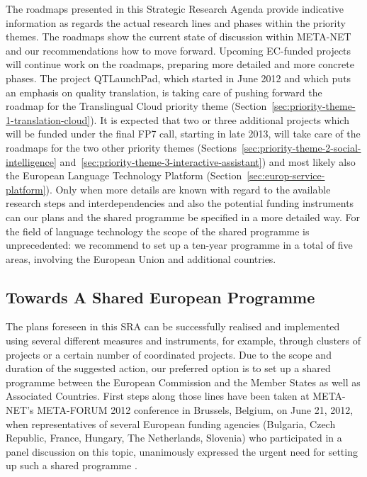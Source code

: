 \documentclass[10pt, plain]{../../metanetpaper}
\begin{document}
\begin{multicols}{2}
The roadmaps presented in this Strategic Research Agenda provide indicative information as regards the actual research lines and phases within the priority themes. The roadmaps show the current state of discussion within META-NET and our recommendations how to move forward. Upcoming EC-funded projects will continue work on the roadmaps, preparing more detailed and more concrete phases. The project QTLaunchPad, which started in June 2012 and which puts an emphasis on quality translation, is taking care of pushing forward the roadmap for the Translingual Cloud priority theme (Section~\ref{sec:priority-theme-1-translation-cloud}). It is expected that two or three additional projects which will be funded under the final FP7 call, starting in late 2013, will take care of the roadmaps for the two other priority themes (Sections~\ref{sec:priority-theme-2-social-intelligence} and~\ref{sec:priority-theme-3-interactive-assistant}) and most likely also the European Language Technology Platform (Section~\ref{sec:europ-service-platform}). Only when more details are known with regard to the available research steps and interdependencies and also the potential funding instruments can our plans and the shared programme be specified in a more detailed way. For the field of language technology the scope of the shared programme is unprecedented: we recommend to set up a ten-year programme in a total of five areas, involving the European Union and additional countries.

\subsection{Towards A Shared European Programme}
\label{sec:towards-shar-europ}

The plans foreseen in this SRA can be successfully realised and implemented using several different measures and instruments, for example, through clusters of projects or a certain number of coordinated projects. Due to the scope and duration of the suggested action, our preferred option is to set up a shared programme between the European Commission and the Member States as well as Associated Countries. First steps along those lines have been taken at META-NET's META-FORUM 2012 conference in Brussels, Belgium, on June 21, 2012, when representatives of several European funding agencies (Bulgaria, Czech Republic, France, Hungary, The Netherlands, Slovenia) who participated in a panel discussion on this topic, unanimously expressed the urgent need for setting up such a shared programme \cite{mf2012}.


\end{multicols}
\end{document}
